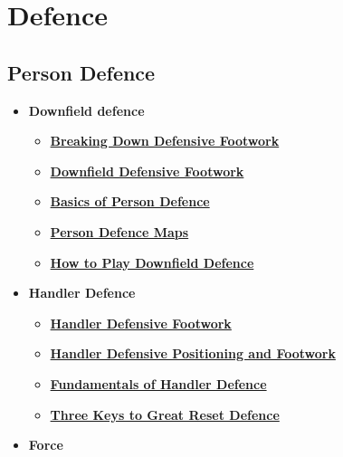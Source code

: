 \section{Defence}
\subsection*{Person Defence}
\begin{itemize}
    \item \textbf{Downfield defence}
    \begin{itemize}
        \item \textcolor{blue}{\textbf{\href{https://skydmagazine.com/2018/06/breaking-down-defensive-footwork/}{Breaking Down Defensive Footwork}}}
        \item \textcolor{blue}{\textbf{\href{https://www.youtube.com/watch?v=WEciFeTDyUY}{Downfield Defensive Footwork}}}
        \item \textcolor{blue}{\textbf{\href{https://ultiworld.com/2015/03/03/basic-concepts-of-person-defense-in-42-seconds/}{Basics of Person Defence}}}
        \item \textcolor{blue}{\textbf{\href{https://drive.google.com/file/d/0B709W22N3JYUb2kwSEpkQTlLelE/view?usp=sharing&resourcekey=0-uNKry7JlJPvAws-Itd6RPg}{Person Defence Maps}}}
         \item \textcolor{blue}{\textbf{\href{https://www.youtube.com/watch?v=qtg999y-YY8}{How to Play Downfield Defence}}}
    \end{itemize}
    \item \textbf{Handler Defence}
    \begin{itemize}
        \item \textcolor{blue}{\textbf{\href{https://www.youtube.com/watch?v=DzNWblkkhFU}{Handler Defensive Footwork}}}
        \item \textcolor{blue}{\textbf{\href{https://www.youtube.com/watch?v=Qc6h7jU9V1M}{Handler Defensive Positioning and Footwork}}}
        \item \textcolor{blue}{\textbf{\href{https://ultiworld.com/2016/03/29/tuesday-tips-fundamentals-handler-defense/}{Fundamentals of Handler Defence}}}
        \item \textcolor{blue}{\textbf{\href{https://ultiworld.com/2020/02/19/tuesday-tips-three-keys-great-reset-defense/}{Three Keys to Great Reset Defence}}}
    \end{itemize}
    \item \textbf{Force}
    \begin{itemize}

\end{itemize}
\end{itemize}
